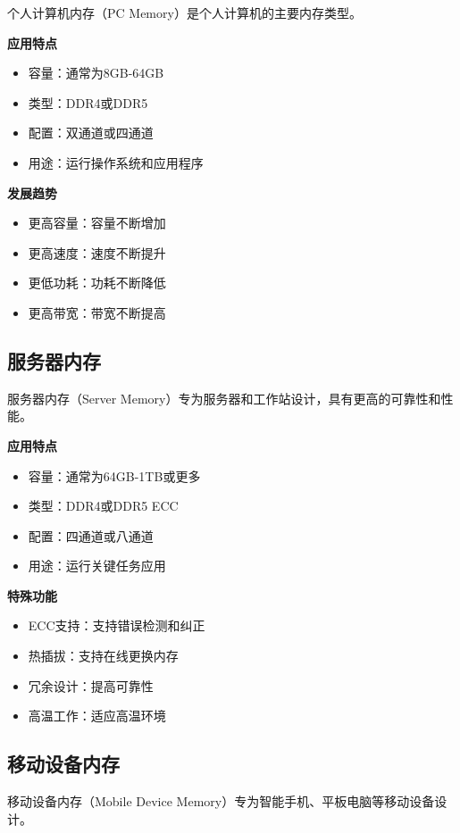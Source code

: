 \documentclass{article}
\begin{document}
个人计算机内存（PC Memory）是个人计算机的主要内存类型。

\textbf{应用特点}
\begin{itemize}
    \item 容量：通常为8GB-64GB
    \item 类型：DDR4或DDR5
    \item 配置：双通道或四通道
    \item 用途：运行操作系统和应用程序
\end{itemize}

\textbf{发展趋势}
\begin{itemize}
    \item 更高容量：容量不断增加
    \item 更高速度：速度不断提升
    \item 更低功耗：功耗不断降低
    \item 更高带宽：带宽不断提高
\end{itemize}

\subsection{服务器内存}

服务器内存（Server Memory）专为服务器和工作站设计，具有更高的可靠性和性能。

\textbf{应用特点}
\begin{itemize}
    \item 容量：通常为64GB-1TB或更多
    \item 类型：DDR4或DDR5 ECC
    \item 配置：四通道或八通道
    \item 用途：运行关键任务应用
\end{itemize}

\textbf{特殊功能}
\begin{itemize}
    \item ECC支持：支持错误检测和纠正
    \item 热插拔：支持在线更换内存
    \item 冗余设计：提高可靠性
    \item 高温工作：适应高温环境
\end{itemize}

\subsection{移动设备内存}

移动设备内存（Mobile Device Memory）专为智能手机、平板电脑等移动设备设计。
\end{document}
